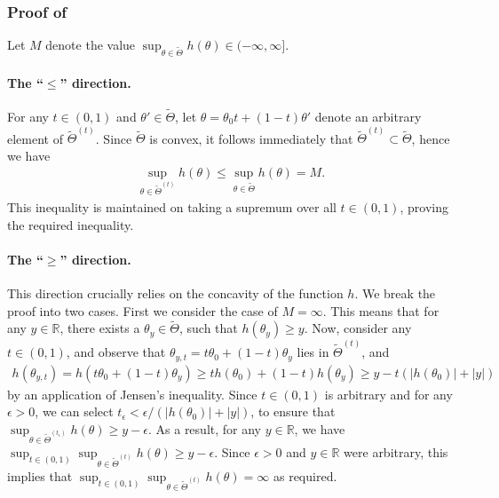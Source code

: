 \documentclass{article}
\theoremstyle{plain}
\theoremstyle{definition}
\newcommand{\lrp}[1]{\left( #1 \right)}
\newcommand{\R}{\mathbb{R}}
\begin{document}
\subsubsection{Proof of~}
\label{proof:approx-constraint-interchange-1}

Let $M$ denote the value $\sup_{\theta \in \widetilde{\Theta}} h(\theta) \in (-\infty, \infty]$. 

\paragraph{The ``$\leq$'' direction.} For any $t \in (0,1)$ and $\theta' \in \widetilde{\Theta}$,  let $\theta = \theta_0 t + (1-t) \theta'$ denote an arbitrary element of $\widetilde{\Theta}^{(t)}$. Since  $\widetilde{\Theta}$ is convex, it follows immediately that $\widetilde{\Theta}^{(t)} \subset \widetilde{\Theta}$, hence we have 
\begin{align}
    \sup_{\theta \in \widetilde{\Theta}^{(t)}} h(\theta) \leq  \sup_{\theta \in \widetilde{\Theta}} h(\theta) = M. 
\end{align}
This inequality is maintained on taking a supremum over all $t \in (0,1)$, proving the required inequality. 

\paragraph{The ``$\geq$'' direction.} This direction crucially relies on the concavity of the function $h$. We break the proof into two cases. First we consider the case of $M = \infty$. This means that for any $y \in \R$, there exists a $\theta_y \in \widetilde{\Theta}$, such that $h(\theta_y) \geq y$. Now, consider any $t \in (0,1)$, and observe that $\theta_{y,t} = t \theta_0 + (1-t) \theta_y$ lies in $\widetilde{\Theta}^{(t)}$, and 
\begin{align}
    h(\theta_{y,t}) = h(t \theta_0 + (1-t) \theta_y) \geq t h(\theta_0) + (1-t) h(\theta_y) \geq y - t \lrp{|h(\theta_0)| + |y|}
\end{align}
by an application of Jensen's inequality. Since $t \in (0,1)$ is arbitrary and for any $\epsilon > 0$, we can select $t_\epsilon < \epsilon/\lrp{|h(\theta_0)| + |y|}$, to ensure that $\sup_{\theta \in \widetilde{\Theta}^{(t_\epsilon)}} h(\theta)  \geq y - \epsilon$. As a result, for any $y \in \R$, we have 
 $\sup_{t \in (0,1)}   \sup_{\theta \in \widetilde{\Theta}^{(t)}} h(\theta)  \geq  y - \epsilon$. Since $\epsilon>0$ and $y \in \R$ were arbitrary, this implies that $\sup_{t \in (0,1)}   \sup_{\theta \in \widetilde{\Theta}^{(t)}} h(\theta) = \infty$ as required. 
\end{document}
